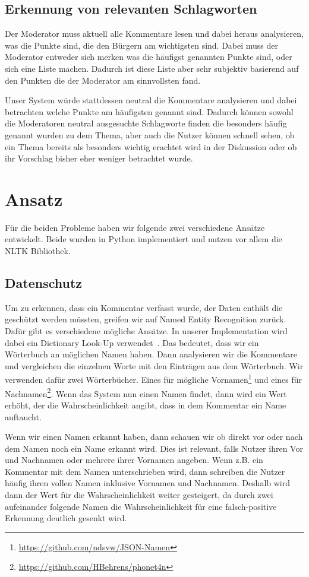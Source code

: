 \documentclass[runningheads]{llncs}
\begin{document}
	\subsection{Erkennung von relevanten Schlagworten}
		Der Moderator muss aktuell alle Kommentare lesen und dabei heraus analysieren, was die Punkte sind, die den Bürgern am wichtigsten sind.
		Dabei muss der Moderator entweder sich merken was die häufigst genannten Punkte sind, oder sich eine Liste machen.
		Dadurch ist diese Liste aber sehr subjektiv basierend auf den Punkten die der Moderator am sinnvollsten fand.
		
		Unser System würde stattdessen neutral die Kommentare analysieren und dabei betrachten welche Punkte am häufigsten genannt sind.
		Dadurch können sowohl die Moderatoren neutral ausgesuchte Schlagworte finden die besonders häufig genannt wurden zu dem Thema, aber auch die Nutzer können schnell sehen, ob ein Thema bereits als besonders wichtig erachtet wird in der Diskussion oder ob ihr Vorschlag bisher eher weniger betrachtet wurde.

\section{Ansatz}
	Für die beiden Probleme haben wir folgende zwei verschiedene Ansätze entwickelt.
	Beide wurden in Python implementiert und nutzen vor allem die NLTK Bibliothek.
	
	\subsection{Datenschutz}
		Um zu erkennen, dass ein Kommentar verfasst wurde, der Daten enthält die geschützt werden müssten, greifen wir auf Named Entity Recognition zurück.
		Dafür gibt es verschiedene mögliche Ansätze.
		In unserer Implementation wird dabei ein Dictionary Look-Up verwendet~\cite{vajjala2020practical}.
		Das bedeutet, dass wir ein Wörterbuch an möglichen Namen haben.
		Dann analysieren wir die Kommentare und vergleichen die einzelnen Worte mit den Einträgen aus dem Wörterbuch.
		Wir verwenden dafür zwei Wörterbücher.
		Eines für mögliche Vornamen\footnote{\url{https://github.com/ndsvw/JSON-Namen}} und eines für Nachnamen\footnote{\url{https://github.com/HBehrens/phonet4n}}.
		Wenn das System nun einen Namen findet, dann wird ein Wert erhöht, der die Wahrscheinlichkeit angibt, dass in dem Kommentar ein Name auftaucht.
		
		Wenn wir einen Namen erkannt haben, dann schauen wir ob direkt vor oder nach dem Namen noch ein Name erkannt wird.
		Dies ist relevant, falls Nutzer ihren Vor und Nachnamen oder mehrere ihrer Vornamen angeben. Wenn z.B. ein Kommentar mit dem Namen unterschrieben wird, dann schreiben die Nutzer häufig ihren vollen Namen inklusive Vornamen und Nachnamen.
		Deshalb wird dann der Wert für die Wahrscheinlichkeit weiter gesteigert, da durch zwei aufeinander folgende Namen die Wahrscheinlichkeit für eine falsch-positive Erkennung deutlich gesenkt wird.
		
\end{document}
